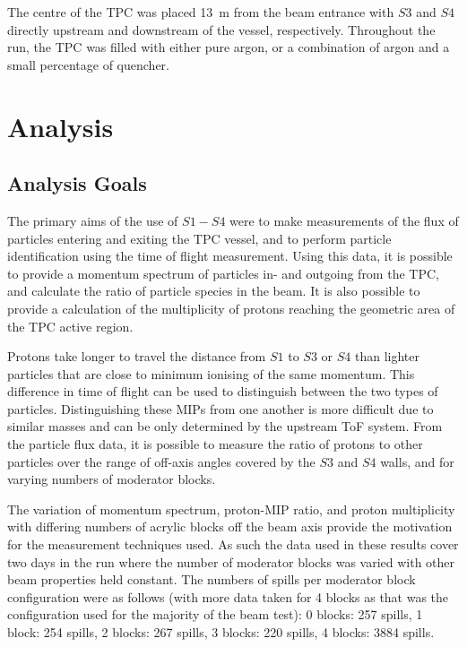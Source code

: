 The centre of the TPC was placed 13~m from the beam entrance with $S3$ and $S4$ directly upstream and downstream of the vessel, respectively. Throughout the run, the TPC was filled with either pure argon, or a combination of argon and a small percentage of quencher.



\section{Analysis}
\subsection{Analysis Goals}
The primary aims of the use of $S1 - S4$ were to make measurements of the flux of particles entering and exiting the TPC vessel, and to perform particle identification using the time of flight measurement.
Using this data, it is possible to provide a momentum spectrum of particles in- and outgoing from the TPC, and calculate the ratio of particle species in the beam. It is also possible to provide a calculation of the multiplicity of protons reaching the geometric area of the TPC active region.

Protons take longer to travel the distance from $S1$ to $S3$ or $S4$ than lighter particles that are close to minimum ionising of the same momentum. This difference in time of flight can be used to distinguish between the two types of particles.
Distinguishing these MIPs from one another is more difficult due to similar masses and can be only determined by the upstream ToF system.
From the particle flux data, it is possible to measure the ratio of protons to other particles over the range of off-axis angles covered by the $S3$ and $S4$ walls, and for varying numbers of moderator blocks.

The variation of momentum spectrum, proton-MIP ratio, and proton multiplicity with differing numbers of acrylic blocks off the beam axis provide the motivation for the measurement techniques used.
As such the data used in these results cover two days in the run where the number of moderator blocks was varied with other beam properties held constant.
The numbers of spills per moderator block configuration were as follows (with more data taken for 4 blocks as that was the configuration used for the majority of the beam test):
0 blocks: 257 spills, 1 block:  254 spills, 2 blocks: 267 spills, 3 blocks: 220 spills, 4 blocks: 3884 spills.


